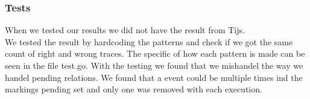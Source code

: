 \subsubsection*{Tests}
When we tested our results we did not have the result from Tijs.\\
We tested the result by hardcoding the patterns and check if we got the same
count of right and wrong traces. The specific of how each pattern is made can be
seen in the file test.go. With the testing we found that we mishandel the way
we handel pending relations. We found that a event could be multiple times
ind the markings pending set and only one was removed with each execution.
